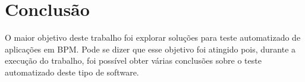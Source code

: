 \documentclass[12pt]{article}
\begin{document}



\section{Conclusão}
O maior objetivo deste trabalho foi explorar soluções para teste automatizado de aplicações em BPM. Pode se dizer que esse objetivo foi atingido pois, durante a execução do trabalho, foi possível obter várias conclusões sobre o teste automatizado deste tipo de software.

\end{document}
